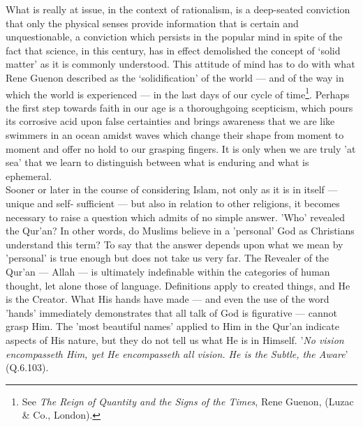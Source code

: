 \documentclass[10pt, twoside]{book}
\begin{document}
What is really at issue, in the context of rationalism, is a deep\hyp{}seated conviction that only the 
physical senses provide information that is certain and unquestionable, a conviction which persists 
in the popular mind in spite of the fact that science, in this century, has in effect demolished the 
concept of `solid matter' as it is commonly understood. This attitude of mind has to do with what 
Rene Guenon described as the `solidification' of the world --- and of the way in which the world is 
experienced --- in the last days of our cycle of time\footnote{See \emph{The Reign of Quantity and the Signs of the Times}, Rene Guenon, (Luzac \& Co., London).}. Perhaps the first step towards faith in our 
age is a thoroughgoing scepticism, which pours its corrosive acid upon false certainties and brings 
awareness that we are like swimmers in an ocean amidst waves which change their shape from moment to moment and offer no hold to our grasping fingers. It is only when we are truly 'at sea' that we learn 
to distinguish between what is enduring and what is ephemeral. \\

Sooner or later in the course of considering Islam, not only as it is in itself --- unique and self-
sufficient --- but also in relation to other religions, it becomes necessary to raise a question which 
admits of no simple answer. 'Who' revealed the Qur'an? In other words, do Muslims believe in a 
'personal' God as Christians understand this term? To say that the answer depends upon what we mean 
by 'personal' is true enough but does not take us very far. The Revealer of the Qur'an --- Allah --- is 
ultimately indefinable within the categories of human thought, let alone those of language. 
Definitions apply to created things, and He is the Creator. What His hands have made --- and even the 
use of the word 'hands' immediately demonstrates that all talk of God is figurative --- cannot grasp 
Him. The 'most beautiful names' applied to Him in the Qur'an indicate aspects of His nature, but they 
do not tell us what He is in Himself. '\emph{No vision encompasseth Him, yet He encompasseth all vision. He is the Subtle, the Aware}' (Q.6.103). \\
\end{document}
